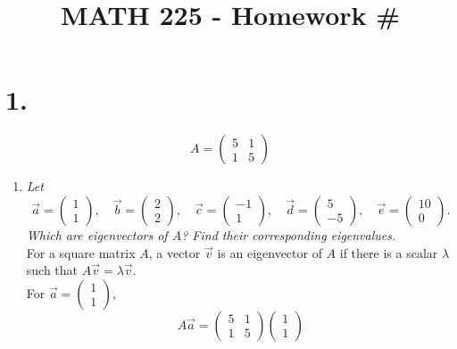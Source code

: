 \documentclass[12pt]{article}
\title{\vspace{-2\baselineskip}MATH 225 - Homework \#\HOMEWORKNUM}
\author{\NAME}
\date{\DATE}
\begin{document}
\maketitle

\section*{1.}
\begin{equation*}
	A = \begin{pmatrix} 5 & 1 \\ 1 & 5 \end{pmatrix}
\end{equation*}
\begin{enumerate}[label=(\alph*)]
	\item \textit{Let}
	\begin{equation*}
		\vec{a} = \begin{pmatrix} 1 \\ 1 \end{pmatrix}, \quad
		\vec{b} = \begin{pmatrix} 2 \\ 2 \end{pmatrix}, \quad
		\vec{c} = \begin{pmatrix} -1 \\ 1 \end{pmatrix},\quad
		\vec{d} = \begin{pmatrix} 5 \\ -5 \end{pmatrix},\quad
		\vec{e} = \begin{pmatrix} 10 \\ 0 \end{pmatrix}.
	\end{equation*}
	\textit{Which are eigenvectors of $A$? Find their corresponding
	eigenvalues.} \\[\baselineskip]
	For a square matrix $A$, a vector $\vec{v}$ is an eigenvector of $A$ if
	there is a scalar $\lambda$ such that $A\vec{v} = \lambda \vec{v}$.
	\\[\baselineskip]
	For $\vec{a} = \begin{pmatrix} 1 \\ 1 \end{pmatrix}$,
	\begin{equation*}
		A \vec{a}
		=
		\begin{pmatrix} 5 & 1 \\ 1 & 5 \end{pmatrix}
		\begin{pmatrix} 1 \\ 1 \end{pmatrix}

\end{equation*}
\end{enumerate}
\end{document}

